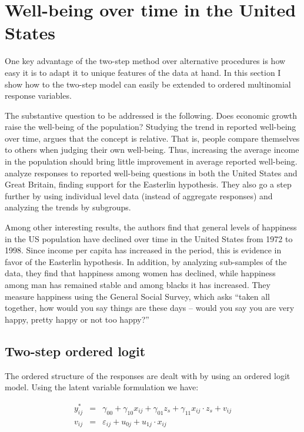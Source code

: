 \section{Well-being over time in the United States }

One key advantage of the two-step method over alternative procedures is how easy it is to adapt it to unique features of the data at hand. In this section I show how to the two-step model can easily be extended to ordered multinomial response variables.

The substantive question to be addressed is the following. Does economic growth raise the well-being of the population? Studying the trend in reported well-being over time, \citet{Easterlin:1974} argues that the concept is relative. That is, people compare themselves to others when judging their own well-being. Thus, increasing the average income in the population should bring little improvement in average reported well-being. \citet{Blanchflower:2004} analyze responses to reported well-being questions in both the United States and Great Britain, finding support for the Easterlin hypothesis. They also go a step further by using individual level data (instead of aggregate responses) and analyzing the trends by subgroups.

Among other interesting results, the authors find that general levels of happiness in the US population have declined over time in the United States from 1972 to 1998. Since income per capita has increased in the period, this is evidence in favor of the Easterlin hypothesis. In addition, by analyzing sub-samples of the data, they find that  happiness among women has declined, while happiness among man has remained stable and among blacks it has increased. They measure happiness using the General Social Survey, which asks ``taken all together, how would you say things are these days -- would you say you are very happy, pretty happy or not too happy?''

\subsection{Two-step ordered logit}

The ordered structure of the responses are dealt with by using an ordered logit model. Using the latent variable formulation we have:

 \begin{eqnarray}
   y^*_{ij}&=&\gamma_{00}+\gamma_{10} x_{ij}+\gamma_{01} z_s+\gamma_{11} x_{ij}\cdot z_s+v_{ij}\\
  v_{ij}&=&\varepsilon_{ij}+u_{0j}+u_{1j}\cdot x_{ij}
   \label{eq:ologit}
\end{eqnarray}

